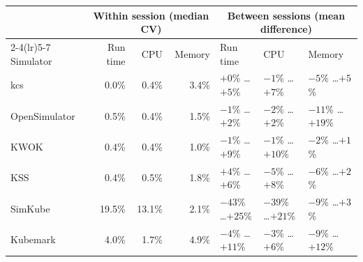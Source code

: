 \begin{tabular}{lrrrlll}
\toprule
 & \multicolumn{3}{c}{Within session (median CV)} & \multicolumn{3}{c}{Between sessions (mean difference)}\\
\cmidrule(lr){2-4}\cmidrule(lr){5-7}
Simulator & Run time & CPU & Memory & Run time & CPU & Memory\\
\midrule
kcs & 0.0\% & 0.4\% & 3.4\% & $+0$\% \ldots $+5$\% & $-1$\% \ldots $+7$\% & $-5$\% \ldots $+5$\%\\
OpenSimulator & 0.5\% & 0.4\% & 1.5\% & $-1$\% \ldots $+2$\% & $-2$\% \ldots $+2$\% & $-11$\% \ldots $+19$\%\\
KWOK & 0.4\% & 0.4\% & 1.0\% & $-1$\% \ldots $+9$\% & $-1$\% \ldots $+10$\% & $-2$\% \ldots $+1$\%\\
KSS & 0.4\% & 0.5\% & 1.8\% & $+4$\% \ldots $+6$\% & $-5$\% \ldots $+8$\% & $-6$\% \ldots $+2$\%\\
SimKube & 19.5\% & 13.1\% & 2.1\% & $-43$\% \ldots $+25$\% & $-39$\% \ldots $+21$\% & $-9$\% \ldots $+3$\%\\
Kubemark & 4.0\% & 1.7\% & 4.9\% & $-4$\% \ldots $+11$\% & $-3$\% \ldots $+6$\% & $-9$\% \ldots $+12$\%\\
\bottomrule
\end{tabular}
